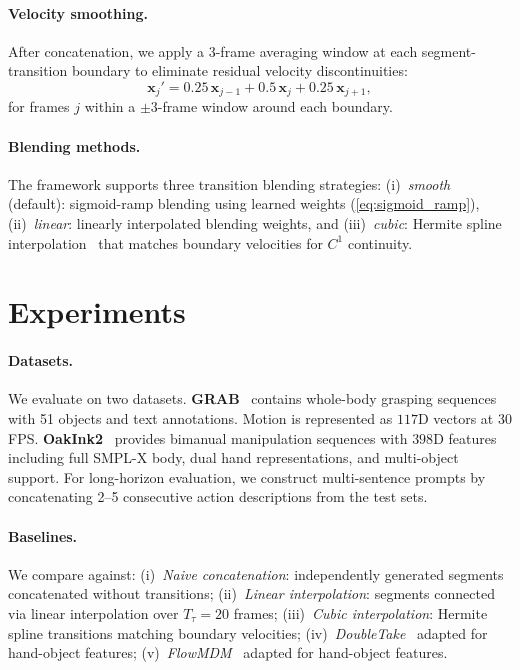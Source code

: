 \documentclass[runningheads]{llncs}
\newcommand{\bx}{\mathbf{x}}
\begin{document}
\paragraph{Velocity smoothing.}
After concatenation, we apply a 3-frame averaging window at each segment-transition boundary to eliminate residual velocity discontinuities:
\begin{equation}
    \bx_j' = 0.25\, \bx_{j-1} + 0.5\, \bx_j + 0.25\, \bx_{j+1},
    \label{eq:smooth}
\end{equation}
for frames $j$ within a $\pm 3$-frame window around each boundary.

\paragraph{Blending methods.}
The framework supports three transition blending strategies: (i)~\emph{smooth} (default): sigmoid-ramp blending using learned weights (\cref{eq:sigmoid_ramp}), (ii)~\emph{linear}: linearly interpolated blending weights, and (iii)~\emph{cubic}: Hermite spline interpolation~\cite{de1978practical} that matches boundary velocities for $C^1$ continuity.


\section{Experiments}
\label{sec:experiments}

\paragraph{Datasets.}
We evaluate on two datasets.
\textbf{GRAB}~\cite{taheri2020grab} contains whole-body grasping sequences with 51 objects and text annotations.
Motion is represented as $117$D vectors at 30 FPS.
\textbf{OakInk2}~\cite{zhan2024oakink2} provides bimanual manipulation sequences with $398$D features including full SMPL-X body, dual hand representations, and multi-object support.
For long-horizon evaluation, we construct multi-sentence prompts by concatenating 2--5 consecutive action descriptions from the test sets.

\paragraph{Baselines.}
We compare against: (i)~\emph{Naive concatenation}: independently generated segments concatenated without transitions; (ii)~\emph{Linear interpolation}: segments connected via linear interpolation over $T_\tau = 20$ frames; (iii)~\emph{Cubic interpolation}: Hermite spline transitions matching boundary velocities; (iv)~\emph{DoubleTake}~\cite{shafir2024doubletake} adapted for hand-object features; (v)~\emph{FlowMDM}~\cite{barquero2024seamless} adapted for hand-object features.
\end{document}
